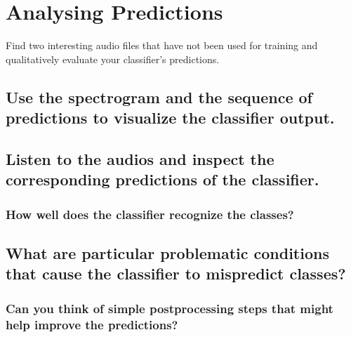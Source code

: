 
\section{Analysing Predictions}
\label{sec:Analysing Predictions}



Find two interesting audio files that have not been used for training and qualitatively evaluate your classifier’s predictions. 



\subsection{Use the spectrogram and the sequence of predictions to visualize the classifier output. }
\label{sec:Analysing Predictions:a}






\subsection{Listen to the audios and inspect the corresponding predictions of the classifier. }
\label{sec:Analysing Predictions:b}



\subsubsection{How well does the classifier recognize the classes? }
\label{sec:Analysing Predictions:b-1}






\subsection{What are particular problematic conditions that cause the classifier to mispredict classes? }
\label{sec:Analysing Predictions:c}



\subsubsection{Can you think of simple postprocessing steps that might help improve the predictions? }
\label{sec:Experiments:c-1}



